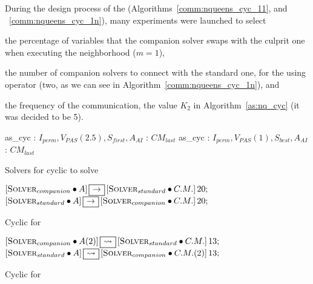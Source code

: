 During the design process of the \commstrs{} (Algorithms~\ref{comm:nqueens_cyc_11}, and ~\ref{comm:nqueens_cyc_1n}), many experiments were launched to select \begin{inparaenum}[1)] \item the percentage of variables that the companion solver swaps with the culprit one when executing the neighborhood \om{} ($m=1$), \item the number of companion solvers to connect with the standard one, for the \commstr{} using operator \oneTn{} (two, as we can see in Algorithm~\ref{comm:nqueens_cyc_1n}), and \item the frequency of the communication, \ie the value $K_2$ in Algorithm~\ref{as:nq_cyc} (it was decided to be 5). \end{inparaenum} 

\begin{algorithm}[h]
\dontprintsemicolon
\SetNoline
{}
   as\_cyc\;
\algoindent {} : $I_{perm}, V_{PAS}(2.5), S_{first}, A_{AI}$ \;
\algoindent {}: $CM_{last}$\;
   as\_cyc\;
\algoindent {} : $I_{perm}, V_{PAS}(1), S_{best}, A_{AI}$ \;
\algoindent {}: $CM_{last}$\;
\caption{Solvers for cyclic \commstr{} to solve \NQP{}}\label{as:nq_cyc}
\end{algorithm}

\begin{algorithm}[H]
\dontprintsemicolon
\SetNoline
$\left[\eqsolverposl{companion}\posldot A\right] \onetoone \left[\eqsolverposl{standard}\posldot C.M.\right]20;$\;
$\left[\eqsolverposl{standard}\posldot A\right] \onetoone \left[\eqsolverposl{companion}\posldot C.M.\right]20;$
\caption{Cyclic \commstr{} \oneTone{} for \NQP}\label{comm:nqueens_cyc_11}
\end{algorithm}

\begin{algorithm}[h]
\dontprintsemicolon
\SetNoline
$\left[\eqsolverposl{companion}\posldot A(2)\right] \oneton \left[\eqsolverposl{standard}\posldot C.M.\right]13;$\;
$\left[\eqsolverposl{standard}\posldot A\right] \oneton \left[\eqsolverposl{companion}\posldot C.M.(2)\right]13;$
\caption{Cyclic \commstr{} \oneTn{} for \NQP}\label{comm:nqueens_cyc_1n}
\end{algorithm}

